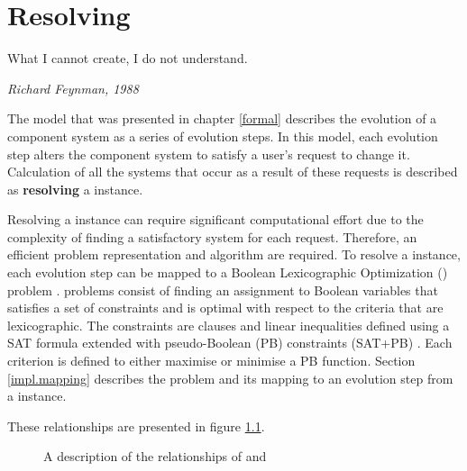 \chapter{Resolving \modelname}
\label{implementation}
\epigraph{What I cannot create, I do not understand.}
{\textit{Richard Feynman, 1988}}
The \modelname model that was presented in chapter \ref{formal} describes the evolution of a component system as a series of evolution steps.
In this model, each evolution step alters the component system to satisfy a user's request to change it.
Calculation of all the systems that occur as a result of these requests is described as \textbf{resolving} a \modelname instance.

Resolving a \modelname instance can require significant computational effort due to the complexity of finding a satisfactory system for each request.
Therefore, an efficient problem representation and algorithm are required.
To resolve a \modelname instance, each evolution step can be mapped to a Boolean Lexicographic Optimization (\modelimpl) problem \citep{marque2011blex}.
\modelimpl problems consist of finding an assignment to Boolean variables that satisfies a set of constraints and is optimal with respect to the criteria that are lexicographic.
The constraints are clauses and linear inequalities defined using a SAT formula extended with pseudo-Boolean (PB) constraints (SAT+PB) \citep{dixon2004automating}.
Each criterion is defined to either maximise or minimise a PB function.
Section \ref{impl.mapping} describes the \modelimpl problem and its mapping to an evolution step from a \modelname instance.

These relationships are presented in figure \ref{impl.modelsatdiagram}.

\begin{figure}[htp]
\begin{center}
  \caption{A description of the relationships of \modelimpl and \modelname}
  \label{impl.modelsatdiagram}
\end{center}
\end{figure}

